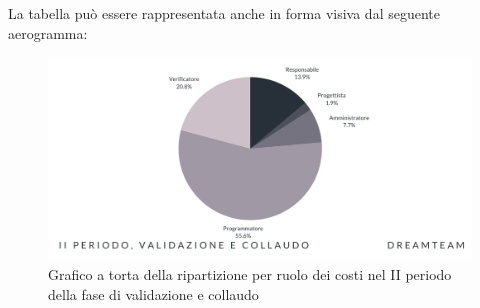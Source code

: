 La tabella può essere rappresentata anche in forma visiva dal seguente aerogramma:
\begin{figure}[H]
\centering
\includegraphics[scale=0.65]{Sezioni/SezioniPreventivo/grafici/Validazione_II_periodo_costi.png}
\caption{Grafico a torta della ripartizione per ruolo dei costi nel II periodo della fase di validazione e collaudo}
\end{figure}



